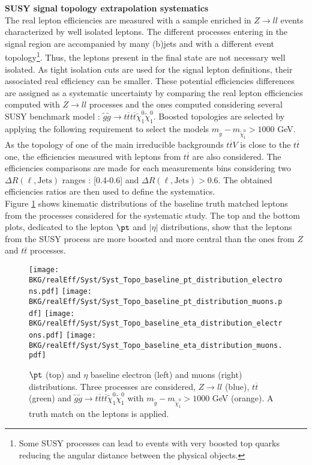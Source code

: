 	\par{\bf SUSY signal topology extrapolation systematics\\}
	The real lepton efficiencies are measured with a sample enriched in $Z\rightarrow ll$ events characterized by well isolated leptons. The different processes entering in the signal region are accompanied by many (b)jets and with a different event topology\footnote{Some SUSY processes can lead to events with very boosted top quarks reducing the angular distance between the physical objects.}. Thus, the leptons present in the final state are not necessary well isolated. As tight isolation cuts are used for the signal lepton definitions, their associated real efficiency can be smaller. These potential efficiencies differences are assigned as a systematic uncertainty by comparing the real lepton efficiencies computed with $Z\rightarrow ll$ processes and the ones computed considering several SUSY benchmark model : $\tilde{g}\tilde{g} \rightarrow t\overline{t}t\overline{t} \tilde{\chi}^0_1 \tilde{\chi}^0_1$. Boosted topologies are selected by applying the following requirement to select the models $m_{\tilde{g}} - m_{\tilde{\chi}^0_1} > 1000$ GeV. As the topology of one of the main irreducible backgrounds $t\overline{t}V$ is close to the $t\overline{t}$ one, the efficiencies measured with leptons from $t\overline{t}$ are also considered. The efficiencies comparisons are made for each measurements \pt bins considering two $\Delta R(\ell,\mathrm{Jets})$ ranges : [0.4-0.6] and $\Delta R(\ell,\mathrm{Jets}) > 0.6$. The obtained efficiencies ratios are then used to define the systematics.\\
	Figure \ref{fig:Syst_kinematics} shows kinematic distributions of the baseline truth matched leptons from the processes considered for the systematic study. The top and the bottom plots, dedicated to the lepton $\pt$ and $|\eta|$ distributions, show that the leptons from the SUSY process are more boosted and more central than the ones from $Z$ and $t\overline{t}$ processes.\\
	
	\begin{figure}[!h]
	  \begin{center} 
	   \texttt{[image: BKG/realEff/Syst/Syst\_Topo\_baseline\_pt\_distribution\_electrons.pdf]} 
	   \texttt{[image: BKG/realEff/Syst/Syst\_Topo\_baseline\_pt\_distribution\_muons.pdf]}
	   \texttt{[image: BKG/realEff/Syst/Syst\_Topo\_baseline\_eta\_distribution\_electrons.pdf]} 
	   \texttt{[image: BKG/realEff/Syst/Syst\_Topo\_baseline\_eta\_distribution\_muons.pdf]}
	   \caption{\label{fig:Syst_kinematics} $\pt$ (top) and $\eta$ baseline electron (left) and muons (right) distributions. Three processes are considered, $Z\rightarrow ll$ (blue), $t\overline{t}$ (green) and  $\tilde{g}\tilde{g} \rightarrow t\overline{t}t\overline{t} \tilde{\chi}^0_1 \tilde{\chi}^0_1$ with $m_{\tilde{g}} - m_{\tilde{\chi}^0_1} > 1000$ GeV (orange). A truth match on the leptons is applied.}
	  \end{center}
	\end{figure}	

